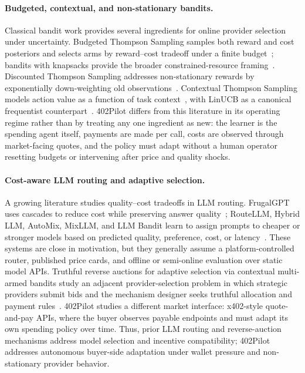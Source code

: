 \paragraph{Budgeted, contextual, and non-stationary bandits.}
Classical bandit work provides several ingredients for online provider selection under uncertainty. Budgeted Thompson Sampling samples both reward and cost posteriors and selects arms by reward--cost tradeoff under a finite budget~\citep{xia2015bts}; bandits with knapsacks provide the broader constrained-resource framing~\citep{badanidiyuru2018bandits}. Discounted Thompson Sampling addresses non-stationary rewards by exponentially down-weighting old observations~\citep{qi2023dsts}. Contextual Thompson Sampling models action value as a function of task context~\citep{agrawal2013contextualts}, with LinUCB as a canonical frequentist counterpart~\citep{li2010linucb}. 402Pilot differs from this literature in its operating regime rather than by treating any one ingredient as new: the learner is the spending agent itself, payments are made per call, costs are observed through market-facing quotes, and the policy must adapt without a human operator resetting budgets or intervening after price and quality shocks.

\paragraph{Cost-aware LLM routing and adaptive selection.}
A growing literature studies quality--cost tradeoffs in LLM routing. FrugalGPT uses cascades to reduce cost while preserving answer quality~\citep{chen2023frugalgpt}; RouteLLM, Hybrid LLM, AutoMix, MixLLM, and LLM Bandit learn to assign prompts to cheaper or stronger models based on predicted quality, preference, cost, or latency~\citep{ong2024routellm,ding2024hybridllm,madaan2024automix,mixllm2024,llmbandit2025}. These systems are close in motivation, but they generally assume a platform-controlled router, published price cards, and offline or semi-online evaluation over static model APIs. Truthful reverse auctions for adaptive selection via contextual multi-armed bandits study an adjacent provider-selection problem in which strategic providers submit bids and the mechanism designer seeks truthful allocation and payment rules~\citep{aamas2026reverseauction}. 402Pilot studies a different market interface: x402-style quote-and-pay APIs, where the buyer observes payable endpoints and must adapt its own spending policy over time. Thus, prior LLM routing and reverse-auction mechanisms address model selection and incentive compatibility; 402Pilot addresses autonomous buyer-side adaptation under wallet pressure and non-stationary provider behavior.

